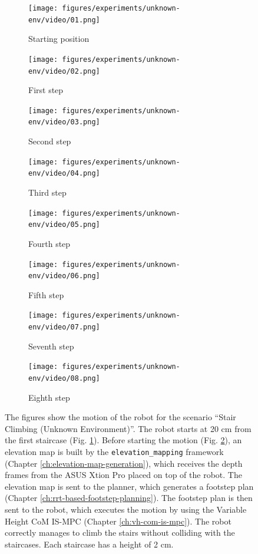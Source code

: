 \begin{figure}
  \begin{subfigure}{0.48\textwidth}
    \texttt{[image: figures/experiments/unknown-env/video/01.png]}
    \caption{Starting position}
    \label{fig:exp:unkenv:frame1}
  \end{subfigure}\hspace*{\fill}
  \begin{subfigure}{0.48\textwidth}
    \texttt{[image: figures/experiments/unknown-env/video/02.png]}
    \caption{First step}
    \label{fig:exp:unkenv:frame2}
  \end{subfigure}
  \begin{subfigure}{0.48\textwidth}
    \texttt{[image: figures/experiments/unknown-env/video/03.png]}
    \caption{Second step}
  \end{subfigure}\hspace*{\fill}
  \begin{subfigure}{0.48\textwidth}
    \texttt{[image: figures/experiments/unknown-env/video/04.png]}
    \caption{Third step}
  \end{subfigure}
  \begin{subfigure}{0.48\textwidth}
    \texttt{[image: figures/experiments/unknown-env/video/05.png]}
    \caption{Fourth step}
  \end{subfigure}\hspace*{\fill}
  \begin{subfigure}{0.48\textwidth}
    \texttt{[image: figures/experiments/unknown-env/video/06.png]}
    \caption{Fifth step}
  \end{subfigure}
  \begin{subfigure}{0.48\textwidth}
    \texttt{[image: figures/experiments/unknown-env/video/07.png]}
    \caption{Seventh step}
  \end{subfigure}\hspace*{\fill}
  \begin{subfigure}{0.48\textwidth}
    \texttt{[image: figures/experiments/unknown-env/video/08.png]}
    \caption{Eighth step}
  \end{subfigure} \caption{The figures show the motion of the robot
      for the scenario ``Stair Climbing (Unknown Environment)''.
      The robot starts at 20 cm 
      from the first staircase (Fig. \ref{fig:exp:unkenv:frame1}). Before 
      starting the motion (Fig. \ref{fig:exp:unkenv:frame2}), an
      elevation map is built by the \texttt{elevation\_mapping} framework
      (Chapter \ref{ch:elevation-map-generation}),
      which receives the depth frames from the ASUS Xtion Pro placed 
      on top of the robot. The elevation map is sent to the planner, which 
      generates a footstep plan (Chapter \ref{ch:rrt-based-footstep-planning}).
      The footstep plan is then sent to the 
      robot, which executes the motion by using the Variable Height CoM
      IS-MPC (Chapter \ref{ch:vh-com-is-mpc}). The robot correctly manages to 
      climb the stairs without colliding with the staircases. Each staircase 
      has a height of 2 cm.}
  \label{fig:experiments:unkenv:videoframes}
\end{figure}

